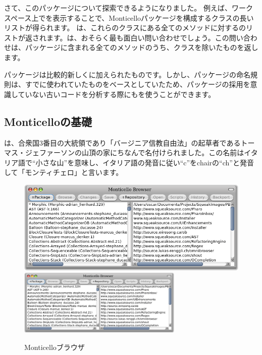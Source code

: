 \documentclass[a4paper,10pt,twoside]{book}
\begin{document}
さて、このパッケージについて探索できるようになりました。
例えば、ワークスペース上でを表示することで、Monticelloパッケージを構成するクラスの長いリストが得られます。
は、これらのクラスにある全てのメソッドに対するのリストが返されます。は、おそらく最も面白い問い合わせでしょう。この問い合わせは、パッケージに含まれる全てのメソッドのうち、クラスを除いたものを返します。

パッケージは比較的新しく\pharo に加えられたものです。しかし、パッケージの命名規則は、すでに使われていたものをベースとしていたため、パッケージの採用を意識していない古いコードを分析する際にもを使うことができます。


\subsection{Monticelloの基礎}

は、合衆国3番目の大統領であり「バージニア信教自由法」の起草者であるトーマス・ジェファーソンの山頂の家にちなんで名付けられました。この名前はイタリア語で``小さな山''を意味し、イタリア語の発音に従い``c''をchairの``ch''と発音して「モンティチェロ」と言います。


\begin{figure}[btp]
\begin{center}
\ifluluelse
{\includegraphics[width=\textwidth]{freshMonticello}}
{\includegraphics[width=0.7\textwidth]{freshMonticello}}
\end{center}
\caption{Monticelloブラウザ}
\end{figure}
\end{document}
